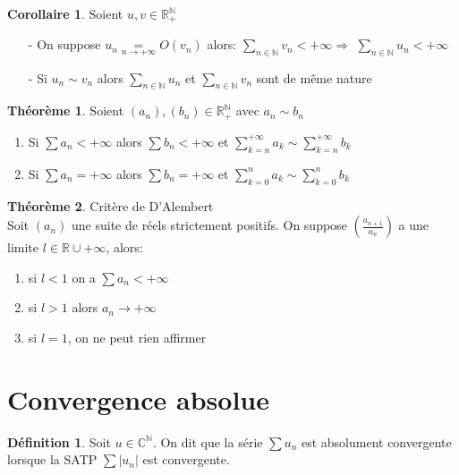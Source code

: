 \documentclass[fleqn]{article}
\theoremstyle{definition} \newtheorem*{defi}{D\'efinition}
\theoremstyle{definition} \newtheorem*{theo}{Th\'eor\`eme}
\theoremstyle{definition} \newtheorem*{coro}{Corollaire}
\theoremstyle{remark} \newtheorem*{rqs}{Remarques}
\theoremstyle{definition} \newtheorem*{prop}{Propri\'et\'e}
\begin{document}
\begin{coro} Soient $u,v \in \mathbb{R}_+^\mathbb{N}$
\begin{enumerate}
	\item [-] On suppose $u_n \underset{n \rightarrow +\infty}{=} O(v_n)$ alors:  $\sum_{n \in \mathbb{N}} v_n < +\infty \Rightarrow$
	$\sum_{n \in \mathbb{N}} u_n < +\infty$
	\item [-] Si $u_n \sim v_n$ alors $\sum_{n \in \mathbb{N}} u_n$ et $\sum_{n \in \mathbb{N}} v_n$ sont de m\^eme nature
\end{enumerate}
\end{coro}

\begin{theo} Soient $(a_n), (b_n) \in \mathbb{R}_+^{\mathbb{N}}$ avec $a_n \sim b_n$
	\begin{enumerate}
		\item Si $\sum a_n < +\infty$ alors $\sum b_n < +\infty$ et $\sum_{k=n}^{+\infty} a_k \sim \sum_{k=n}^{+\infty} b_k$
		\item Si $\sum a_n = +\infty$ alors $\sum b_n = +\infty$ et $\sum_{k=0}^{n} a_k \sim \sum_{k=0}^{n} b_k$
	\end{enumerate}
\end{theo}

\begin{theo} Crit\`ere de D'Alembert\\
	Soit $(a_n)$ une suite de r\'eels strictement positifs. On suppose $(\frac{a_{n+1}}{a_n})$ a une limite $l \in \mathbb{R} \cup +\infty$,
		alors: \begin{enumerate}
		\item si $l < 1$ on a $\sum a_n < +\infty$
		\item si $l > 1$ alors $a_n \rightarrow +\infty$
		\item si $l = 1$, on ne peut rien affirmer
	\end{enumerate}
\end{theo}


\section{Convergence absolue}
\begin{defi} Soit $u \in \mathbb{C}^\mathbb{N}$. On dit que la s\'erie $\sum u_n$ est absolument convergente lorsque la SATP $\sum |u_n|$ est
convergente.
\end{defi}
\end{document}

